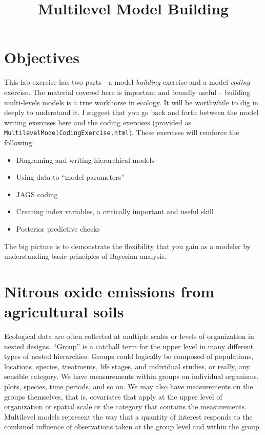 \documentclass[12pt, oneside]{article}
\title{\vspace{-1cm}Multilevel Model Building}
\begin{document}
\maketitle

\thispagestyle{fancy}

\section*{Objectives}
This lab exercise has two parts---a model \emph{building} exercise and a model \emph{coding} exercise.  The material covered here is important and broadly useful -- building multi-levels models is a true workhorse in ecology. It will be worthwhile to dig in deeply to understand it.  I suggest that you go back and forth between the model writing exercises here and the coding exercises (provided as \texttt{MultilevelModelCodingExercise.html}). These exercises will reinforce the following:

\begin{itemize}
\item Diagraming and writing hierarchical models
\item Using data to ``model parameters''
\item JAGS coding
\item Creating index variables, a critically important and useful skill
\item Posterior predictive checks
\end{itemize}
The big picture is to demonstrate the flexibility that you gain as a modeler by understanding basic principles of Bayesian analysis. 
\newpage

\section*{Nitrous oxide emissions from agricultural soils}

Ecological data are often collected at multiple scales or levels of organization in nested designs. ``Group'' is a catchall term for the upper level in many different types of nested hierarchies. Groups could logically be composed of populations, locations, species, treatments, life stages, and individual studies, or really, any sensible category. We have measurements within groups on individual organisms, plots, species, time periods, and so on. We may also have measurements on the groups themselves, that is, covariates that apply at the upper level of organization or spatial scale or the category that contains the measurements. Multilevel models represent the way that a quantity of interest responds to the combined influence of observations taken at the group level and within the group. 
\end{document}
